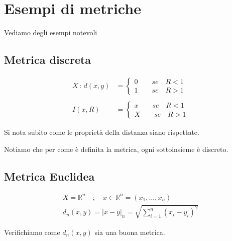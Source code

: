 \section{Esempi di metriche}

Vediamo degli esempi notevoli

\subsection{Metrica discreta}

\begin{align}
X \, : \, d(x,y) {}&= \left\{
\begin{array}{cc}
0  \qquad se \quad R<1\\
1  \qquad se \quad R>1
\end{array}
\right. \\
\nonumber \\
I(x,R) &= \left\{
\begin{array}{cc}
x  \qquad se \quad R<1\\
X  \qquad se \quad R>1
\end{array}
\right.
\end{align}

Si nota subito come le proprietà della distanza siano rispettate.

Notiamo che per come è definita la metrica, ogni sottoinsieme è discreto.

\subsection{Metrica Euclidea}

\begin{align}
X= \mathbb{R}^n \quad ; \quad x \in \mathbb{R}^n = (x_1, \dots , x_n) \\
d_n(x,y)= |x-y|_n = \sqrt{\sum_{i=1}^{n} (x_i - y_i)^2}
\end{align}

Verifichiamo come $d_n(x,y)$ sia una buona metrica.

